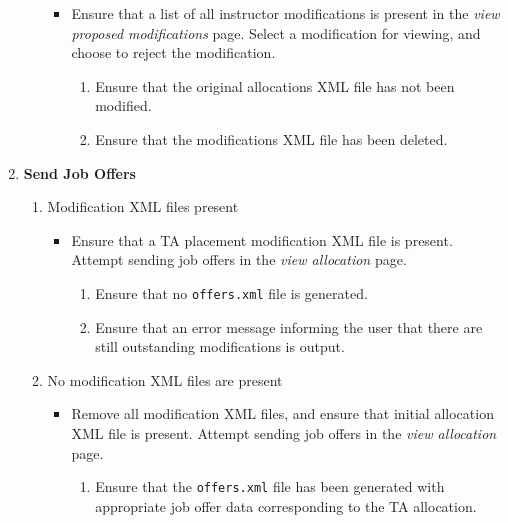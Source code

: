 \documentclass[12pt]{report}
\begin{document}
\begin{enumerate}
\begin{enumerate}
\begin{itemize}
					\item Ensure that a list of all instructor modifications is present in the
						\textit{view proposed modifications} page. Select a modification for
						viewing, and choose to reject the modification.
						\begin{enumerate}
							\item Ensure that the original allocations XML file has not been
								modified.
							\item Ensure that the modifications XML file has been deleted.
						\end{enumerate}
				\end{itemize}
		\end{enumerate}
	\item \textbf{Send Job Offers}
		\begin{enumerate}
			\item Modification XML files present
				\begin{itemize}
					\item Ensure that a TA placement modification XML file is present. Attempt
						sending job offers in the \textit{view allocation} page.
						\begin{enumerate}
							\item Ensure that no \texttt{offers.xml} file is generated.
							\item Ensure that an error message informing the user that there are
								still outstanding modifications is output.
						\end{enumerate}
				\end{itemize}
			\item No modification XML files are present
				\begin{itemize}
					\item Remove all modification XML files, and ensure that initial allocation XML
						file is present. Attempt sending job offers in the \textit{view allocation}
						page.
						\begin{enumerate}
							\item Ensure that the \texttt{offers.xml} file has been generated with
								appropriate job offer data corresponding to the TA allocation.
						\end{enumerate}
				\end{itemize}
		\end{enumerate}
\end{enumerate}
\end{document}
